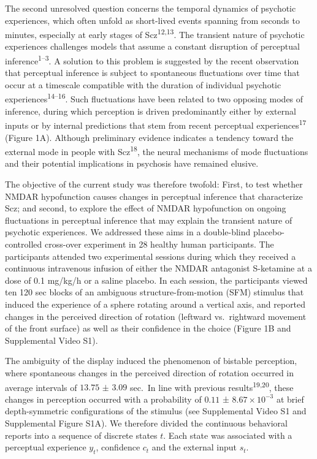 \documentclass[
]{article}
\begin{document}
The second unresolved question concerns the temporal dynamics of
psychotic experiences, which often unfold as short-lived events spanning
from seconds to minutes, especially at early stages of
Scz\textsuperscript{12,13}. The transient nature of psychotic
experiences challenges models that assume a constant disruption of
perceptual inference\textsuperscript{1--3}. A solution to this problem
is suggested by the recent observation that perceptual inference is
subject to spontaneous fluctuations over time that occur at a timescale
compatible with the duration of individual psychotic
experiences\textsuperscript{14--16}. Such fluctuations have been related
to two opposing modes of inference, during which perception is driven
predominantly either by external inputs or by internal predictions that
stem from recent perceptual experiences\textsuperscript{17} (Figure 1A).
Although preliminary evidence indicates a tendency toward the external
mode in people with Scz\textsuperscript{18}, the neural mechanisms of
mode fluctuations and their potential implications in psychosis have
remained elusive.

The objective of the current study was therefore twofold: First, to test
whether NMDAR hypofunction causes changes in perceptual inference that
characterize Scz; and second, to explore the effect of NMDAR
hypofunction on ongoing fluctuations in perceptual inference that may
explain the transient nature of psychotic experiences. We addressed
these aims in a double-blind placebo-controlled cross-over experiment in
28 healthy human participants. The participants attended two
experimental sessions during which they received a continuous
intravenous infusion of either the NMDAR antagonist S-ketamine at a dose
of 0.1 mg/kg/h or a saline placebo. In each session, the participants
viewed ten 120 sec blocks of an ambiguous structure-from-motion (SFM)
stimulus that induced the experience of a sphere rotating around a
vertical axis, and reported changes in the perceived direction of
rotation (leftward vs.~rightward movement of the front surface) as well
as their confidence in the choice (Figure 1B and Supplemental Video S1).

The ambiguity of the display induced the phenomenon of bistable
perception, where spontaneous changes in the perceived direction of
rotation occurred in average intervals of \(13.75\) ± \(3.09\) sec.~In
line with previous results\textsuperscript{19,20}, these changes in
perception occurred with a probability of \(0.11\) ±
\(\ensuremath{8.67\times 10^{-3}}\) at brief depth-symmetric
configurations of the stimulus (see Supplemental Video S1 and
Supplemental Figure S1A). We therefore divided the continuous behavioral
reports into a sequence of discrete states \(t\). Each state was
associated with a perceptual experience \(y_t\), confidence \(c_t\) and
the external input \(s_t\).
\end{document}
